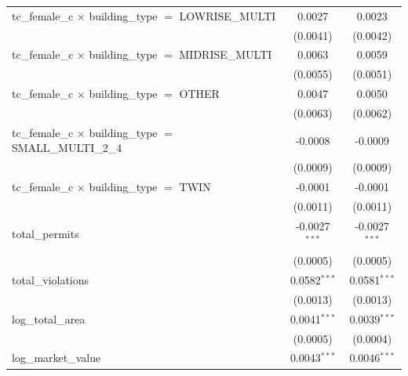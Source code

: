 \begin{tabular}{lcc}
   tc\_female\_c $\times$ building\_type $=$ LOWRISE\_MULTI            & 0.0027                 & 0.0023\\   
                                                                       & (0.0041)               & (0.0042)\\   
   tc\_female\_c $\times$ building\_type $=$ MIDRISE\_MULTI            & 0.0063                 & 0.0059\\   
                                                                       & (0.0055)               & (0.0051)\\   
   tc\_female\_c $\times$ building\_type $=$ OTHER                     & 0.0047                 & 0.0050\\   
                                                                       & (0.0063)               & (0.0062)\\   
   tc\_female\_c $\times$ building\_type $=$ SMALL\_MULTI\_2\_4        & -0.0008                & -0.0009\\   
                                                                       & (0.0009)               & (0.0009)\\   
   tc\_female\_c $\times$ building\_type $=$ TWIN                      & -0.0001                & -0.0001\\   
                                                                       & (0.0011)               & (0.0011)\\   
   total\_permits                                                      & -0.0027$^{***}$        & -0.0027$^{***}$\\   
                                                                       & (0.0005)               & (0.0005)\\   
   total\_violations                                                   & 0.0582$^{***}$         & 0.0581$^{***}$\\   
                                                                       & (0.0013)               & (0.0013)\\   
   log\_total\_area                                                    & 0.0041$^{***}$         & 0.0039$^{***}$\\   
                                                                       & (0.0005)               & (0.0004)\\   
   log\_market\_value                                                  & 0.0043$^{***}$         & 0.0046$^{***}$\\   

\end{tabular}
